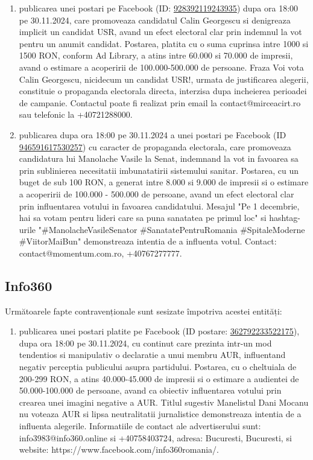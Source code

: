 \documentclass[a4paper,12pt]{article}
\begin{document}
\begin{enumerate}[leftmargin=*, label=\arabic*.)]
    \item publicarea unei postari pe Facebook (ID: \href{https://www.facebook.com/ads/library/?id=928392119243935}{928392119243935}) dupa ora 18:00 pe 30.11.2024, care promoveaza candidatul Calin Georgescu si denigreaza implicit un candidat USR, avand un efect electoral clar prin indemnul la vot pentru un anumit candidat. Postarea, platita cu o suma cuprinsa intre 1000 si 1500 RON, conform Ad Library, a atins intre 60.000 si 70.000 de impresii, avand o estimare a acoperirii de 100.000-500.000 de persoane.  Fraza Voi vota Calin Georgescu, nicidecum un candidat USR!, urmata de justificarea alegerii, constituie o propaganda electorala directa, interzisa dupa incheierea perioadei de campanie.  Contactul poate fi realizat prin email la contact@mirceacirt.ro sau telefonic la +40721288000.
    \item publicarea dupa ora 18:00 pe 30.11.2024 a unei postari pe Facebook (ID \href{https://www.facebook.com/ads/library/?id=946591617530257}{946591617530257}) cu caracter de propaganda electorala, care promoveaza candidatura lui Manolache Vasile la Senat, indemnand la vot in favoarea sa prin sublinierea necesitatii imbunatatirii sistemului sanitar.  Postarea, cu un buget de sub 100 RON, a generat intre 8.000 si 9.000 de impresii si o estimare a acoperirii de 100.000 - 500.000 de persoane, avand un efect electoral clar prin influentarea votului in favoarea candidatului.  Mesajul "Pe 1 decembrie, hai sa votam pentru lideri care sa puna sanatatea pe primul loc" si hashtag-urile "\#ManolacheVasileSenator \#SanatatePentruRomania \#SpitaleModerne \#ViitorMaiBun" demonstreaza intentia de a influenta votul.  Contact: contact@momentum.com.ro, +40767277777.
\end{enumerate}

\vspace{0.5cm}

\subsection{Info360}
Următoarele fapte contravenționale sunt sesizate împotriva acestei entități:

\begin{enumerate}[leftmargin=*, label=\arabic*.)]
    \item publicarea unei postari platite pe Facebook (ID postare: \href{https://www.facebook.com/ads/library/?id=362792233522175}{362792233522175}), dupa ora 18:00 pe 30.11.2024, cu continut care prezinta intr-un mod tendentios si manipulativ o declaratie a unui membru AUR, influentand negativ perceptia publicului asupra partidului.  Postarea, cu o cheltuiala de 200-299 RON, a atins 40.000-45.000 de impresii si o estimare a audientei de 50.000-100.000 de persoane, avand ca obiectiv influentarea votului prin crearea unei imagini negative a AUR. Titlul sugestiv Manelistul Dani Mocanu nu voteaza AUR si lipsa neutralitatii jurnalistice demonstreaza intentia de a influenta alegerile.  Informatiile de contact ale advertiserului sunt: info3983@info360.online si +40758403724, adresa: Bucuresti, Bucuresti, si website: https://www.facebook.com/info360romania/.
\end{enumerate}
\end{document}
